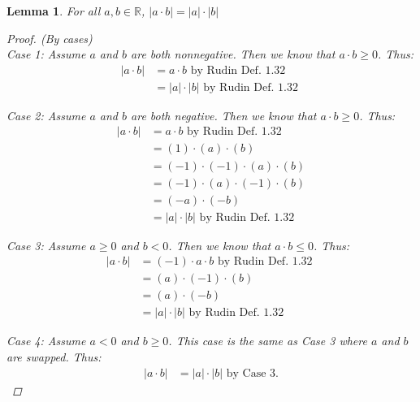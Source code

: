 \documentclass{amsart}
\newtheorem{lemma}[theorem]{Lemma}
\begin{document}
\begin{lemma}
    For all $a,b \in\mathbb{R}$, $|a\cdot b| = |a|\cdot|b|$
    \begin{proof} (By cases) \\

        Case 1: Assume $a$ and $b$ are both nonnegative. Then we know that $a\cdot b \geq 0$. Thus:
        \begin{align*}
            |a \cdot b| &= a \cdot b \text{ by Rudin Def. 1.32 } \\
            &= |a| \cdot |b| \text{ by Rudin Def. 1.32 } 
        \end{align*}

        Case 2: Assume $a$ and $b$ are both negative. Then we know that $a\cdot b \geq 0$. Thus:
        \begin{align*}
            |a \cdot b| &= a \cdot b \text{ by Rudin Def. 1.32 } \\
            &= (1)\cdot(a)\cdot (b) \\
            &= (-1)\cdot(-1)\cdot(a)\cdot (b) \\
            &= (-1)\cdot(a)\cdot(-1)\cdot (b) \\
            &= (-a)\cdot(-b) \\
            &= |a| \cdot |b| \text{ by Rudin Def. 1.32 } 
        \end{align*}

        Case 3: Assume $a \geq 0$ and $b < 0$. Then we know that $a\cdot b \leq 0$. Thus:
        \begin{align*}
            |a \cdot b| &= (-1) \cdot a \cdot b \text{ by Rudin Def. 1.32 } \\
            &= (a)\cdot(-1)\cdot (b) \\
            &= (a)\cdot(-b) \\
            &= |a| \cdot |b| \text{ by Rudin Def. 1.32 } 
        \end{align*}

        Case 4: Assume $a < 0$ and $b \geq 0$. This case is the same as Case 3 where $a$ and $b$ are swapped. Thus:
        \begin{align*}
            |a \cdot b| &= |a| \cdot |b| \text{ by Case 3.}
        \end{align*}
    \end{proof}
\end{lemma}
\end{document}
